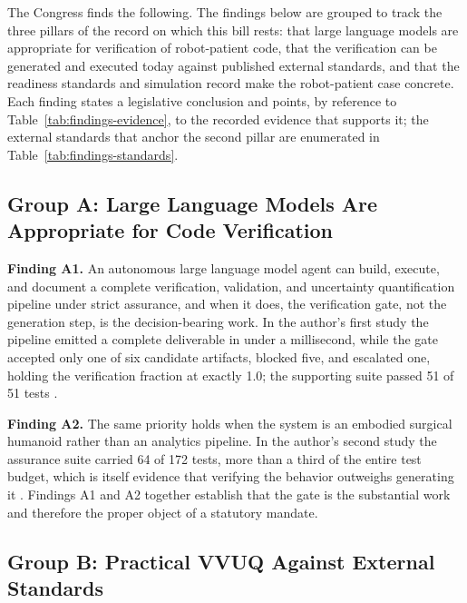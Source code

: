 
The Congress finds the following. The findings below are grouped to track the
three pillars of the record on which this bill rests: that large language models
are appropriate for verification of robot-patient code, that the verification can
be generated and executed today against published external standards, and that
the readiness standards and simulation record make the robot-patient case
concrete. Each finding states a legislative conclusion and points, by reference
to Table~\ref{tab:findings-evidence}, to the recorded evidence that supports it;
the external standards that anchor the second pillar are enumerated in
Table~\ref{tab:findings-standards}.

\subsection{Group A: Large Language Models Are Appropriate for Code Verification}

\textbf{Finding A1.} An autonomous large language model agent can build, execute,
and document a complete verification, validation, and uncertainty quantification
pipeline under strict assurance, and when it does, the verification gate, not the
generation step, is the decision-bearing work. In the author's first study the
pipeline emitted a complete deliverable in under a millisecond, while the gate
accepted only one of six candidate artifacts, blocked five, and escalated one,
holding the verification fraction at exactly 1.0; the supporting suite passed 51
of 51 tests \cite{kawchak2026vvuq01}.

\textbf{Finding A2.} The same priority holds when the system is an embodied
surgical humanoid rather than an analytics pipeline. In the author's second study
the assurance suite carried 64 of 172 tests, more than a third of the entire test
budget, which is itself evidence that verifying the behavior outweighs generating
it \cite{kawchak2026vvuq02}. Findings A1 and A2 together establish that the gate
is the substantial work and therefore the proper object of a statutory mandate.

\subsection{Group B: Practical VVUQ Against External Standards}

